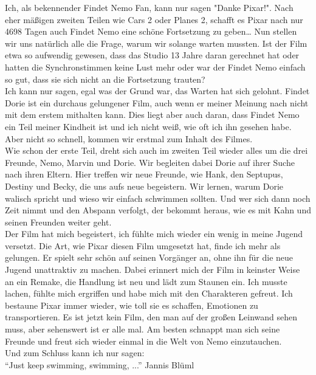 {Ich, als bekennender Findet Nemo Fan, kann nur sagen "Danke Pixar!". Nach eher mäßigen zweiten Teilen wie Cars 2 oder Planes 2, schafft es Pixar nach nur 4698 Tagen auch Findet Nemo eine schöne Fortsetzung zu geben…
}
{ Nun stellen wir uns natürlich alle die Frage, warum wir solange warten mussten. Ist der Film etwa so aufwendig gewesen, dass das Studio 13 Jahre daran gerechnet hat oder hatten die Synchronstimmen keine Lust mehr oder war der Findet Nemo einfach so gut, dass sie sich nicht an die Fortsetzung trauten? \\

Ich kann nur sagen, egal was der Grund war, das Warten hat sich gelohnt. Findet Dorie ist ein durchaus gelungener Film, auch wenn er meiner Meinung nach nicht mit dem erstem mithalten kann. Dies liegt aber auch daran, dass Findet Nemo ein Teil meiner Kindheit ist und ich nicht weiß, wie oft ich ihn gesehen habe. Aber nicht so schnell, kommen wir erstmal zum Inhalt des Filmes. \\

Wie schon der erste Teil, dreht sich auch im zweiten Teil wieder alles um die drei Freunde, Nemo, Marvin und Dorie. Wir begleiten dabei Dorie auf ihrer Suche nach ihren Eltern.  Hier treffen wir neue Freunde, wie Hank, den Septupus, Destiny und Becky, die uns aufs neue begeistern. Wir lernen, warum Dorie walisch spricht und wieso wir einfach schwimmen sollten. Und wer sich dann noch Zeit nimmt und den Abspann verfolgt, der bekommt heraus, wie es mit Kahn und seinen Freunden weiter geht. \\

Der Film hat mich begeistert, ich fühlte mich wieder ein wenig in meine Jugend versetzt. Die Art, wie Pixar diesen Film umgesetzt hat, finde ich mehr als gelungen. Er spielt sehr schön auf seinen Vorgänger an, ohne ihn für die neue Jugend unattraktiv zu machen. Dabei erinnert mich der Film in keinster Weise an ein Remake, die Handlung ist neu und lädt zum Staunen ein. Ich musste lachen, fühlte mich ergriffen und habe mich mit den Charakteren gefreut. Ich bestaune Pixar immer wieder, wie toll sie es schaffen, Emotionen zu transportieren. Es ist jetzt kein Film, den man auf der großen Leinwand sehen muss, aber sehenswert ist er alle mal. Am besten schnappt man sich seine Freunde und freut sich wieder einmal in die Welt von Nemo einzutauchen.   \\

Und zum Schluss kann ich nur sagen: \\
 "`Just keep swimming, swimming, ..."'
}
{Jannis Blüml}
